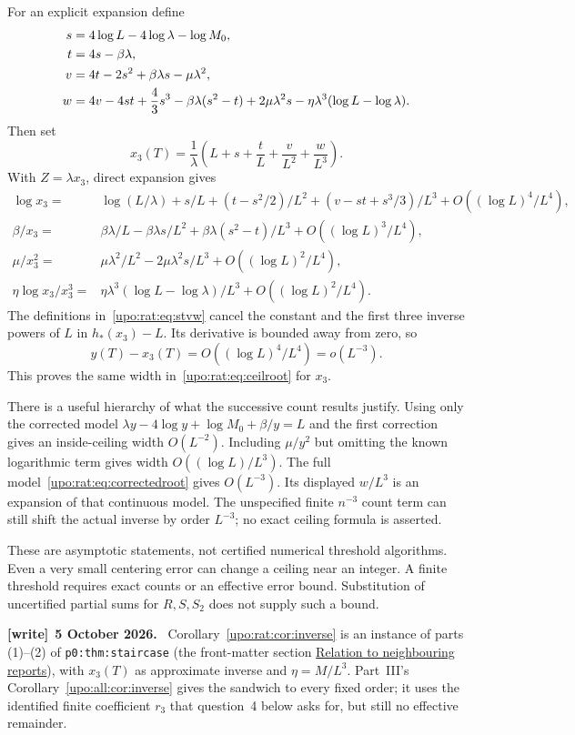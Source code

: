 \documentclass[11pt,letterpaper]{article}
\theoremstyle{remark}\newtheorem{remark}[theorem]{Remark}
\numberwithin{equation}{section}
\newenvironment{writenote}[1][]{\par\smallskip\begingroup\small
 \noindent\textbf{[write]}\if\relax\detokenize{#1}\relax\else~\textbf{#1.}\fi\ }%
 {\par\endgroup\smallskip}
\begin{document}
For an explicit expansion define
\begin{align}
s&=4\log L-4\log\lambda-\log M_0,\notag\\
t&=4s-\beta\lambda,\notag\\
v&=4t-2s^2+\beta\lambda s-\mu\lambda^2,\label{upo:rat:eq:stvw}\\
w&=4v-4st+\frac43s^3-\beta\lambda(s^2-t)
 +2\mu\lambda^2s-\eta\lambda^3(\log L-\log\lambda).\notag
\end{align}
Then set
\begin{equation}\label{upo:rat:eq:x3}
x_3(T)=\frac1\lambda
\left(L+s+\frac tL+\frac v{L^2}+\frac w{L^3}\right).
\end{equation}
With $Z=\lambda x_3$, direct expansion gives
\begin{align*}
\log x_3={}&\log(L/\lambda)+s/L+(t-s^2/2)/L^2
 +(v-st+s^3/3)/L^3+O((\log L)^4/L^4),\\
\beta/x_3={}&\beta\lambda/L-\beta\lambda s/L^2
 +\beta\lambda(s^2-t)/L^3+O((\log L)^3/L^4),\\
\mu/x_3^2={}&\mu\lambda^2/L^2-2\mu\lambda^2s/L^3
 +O((\log L)^2/L^4),\\
\eta\log x_3/x_3^3={}&\eta\lambda^3(\log L-\log\lambda)/L^3
 +O((\log L)^2/L^4).
\end{align*}
The definitions in~\eqref{upo:rat:eq:stvw} cancel the constant and the first
three inverse powers of $L$ in $h_*(x_3)-L$. Its derivative is bounded
away from zero, so
\begin{equation}\label{upo:rat:eq:x3error}
y(T)-x_3(T)=O((\log L)^4/L^4)=o(L^{-3}).
\end{equation}
This proves the same width in~\eqref{upo:rat:eq:ceilroot} for $x_3$.

There is a useful hierarchy of what the successive count results justify.
Using only the corrected model
$\lambda y-4\log y+\log M_0+\beta/y=L$ and the first correction gives
an inside-ceiling width $O(L^{-2})$. Including $\mu/y^2$ but omitting
the known logarithmic term gives width $O((\log L)/L^3)$.
The full model~\eqref{upo:rat:eq:correctedroot} gives $O(L^{-3})$.
Its displayed $w/L^3$ is an expansion of that continuous model.
The unspecified finite $n^{-3}$ count term can still shift the actual
inverse by order $L^{-3}$; no exact ceiling formula is asserted.

These are asymptotic statements, not certified numerical threshold
algorithms. Even a very small centering error can change a ceiling near
an integer. A finite threshold requires exact counts or an effective
error bound. Substitution of uncertified partial sums for $R,S,S_2$
does not supply such a bound.
\begin{writenote}[5 October 2026]
Corollary~\ref{upo:rat:cor:inverse} is an instance of parts (1)--(2) of \texttt{p0:thm:staircase} (the front-matter section \hyperref[upo:sec:neighbours]{Relation to neighbouring reports}), with $x_3(T)$ as approximate inverse and $\eta=M/L^3$. Part~III's Corollary~\ref{upo:all:cor:inverse} gives the sandwich to every fixed order; it uses the identified finite coefficient $r_3$ that question~4 below asks for, but still no effective remainder.
\end{writenote}
\end{document}
